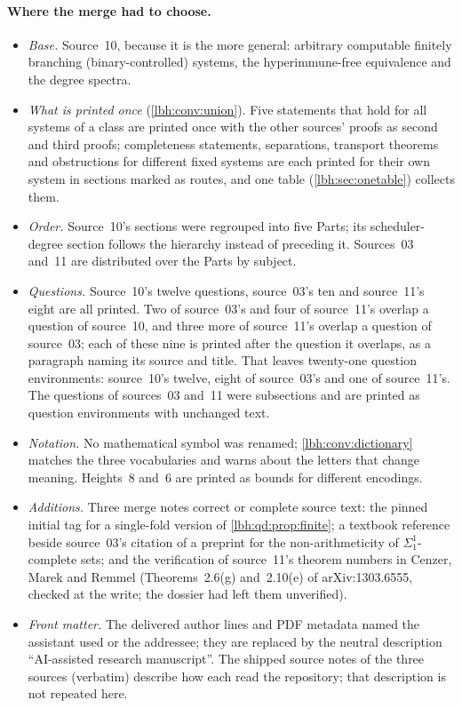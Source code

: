 \documentclass[11pt,letterpaper]{article}
\theoremstyle{definition}
\theoremstyle{remark}
\newcommand{\an}{\Sigma^{1}_{1}}
\newcommand{\1}{\mathbf 1}
\begin{document}
\paragraph{Where the merge had to choose.}
\begin{itemize}
\item \emph{Base.} Source~10, because it is the more general: arbitrary computable finitely
branching (binary-controlled) systems, the hyperimmune-free equivalence and the degree spectra.
\item \emph{What is printed once} (\cref{lbh:conv:union}). Five statements that hold for all
systems of a class are printed once with the other sources' proofs as second and third proofs;
completeness statements, separations, transport theorems and obstructions for different fixed
systems are each printed for their own system in sections marked as routes, and one table
(\cref{lbh:sec:onetable}) collects them.
\item \emph{Order.} Source~10's sections were regrouped into five Parts; its scheduler-degree
section follows the hierarchy instead of preceding it. Sources~03 and~11 are distributed over the
Parts by subject.
\item \emph{Questions.} Source~10's twelve questions, source~03's ten and source~11's eight are
all printed. Two of source~03's and four of source~11's overlap a question of source~10, and
three more of source~11's overlap a question of source~03; each of these nine is printed after the
question it overlaps, as a paragraph naming its source and title. That leaves twenty-one question
environments: source~10's twelve, eight of source~03's and one of source~11's. The questions of
sources~03 and~11 were subsections and are printed as question environments with unchanged text.
\item \emph{Notation.} No mathematical symbol was renamed; \cref{lbh:conv:dictionary} matches the
three vocabularies and warns about the letters that change meaning. Heights~$8$ and~$6$ are printed
as bounds for different encodings.
\item \emph{Additions.} Three merge notes correct or complete source text: the pinned initial tag
for a single-fold version of \cref{lbh:qd:prop:finite}; a textbook reference beside source~03's
citation of a preprint for the non-arithmeticity of $\an$-complete sets; and the verification of
source~11's theorem numbers in Cenzer, Marek and Remmel (Theorems~2.6(g) and~2.10(e) of
arXiv:1303.6555, checked at the write; the dossier had left them unverified).
\item \emph{Front matter.} The delivered author lines and PDF metadata named the assistant used or
the addressee; they are replaced by the neutral description ``AI-assisted research manuscript''.
The shipped source notes of the three sources (verbatim) describe how each read the repository;
that description is not repeated here.
\end{itemize}
\end{document}
